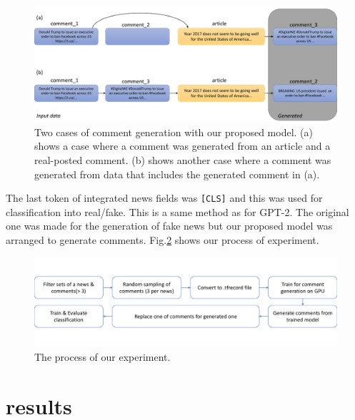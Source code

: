 \documentclass[conference]{IEEEtran}
\begin{document}
\begin{figure}[!t]
    \centering
    \includegraphics[width=\linewidth,pagebox=cropbox,clip]{fig_method.pdf}
    \caption{
        Two cases of comment generation with our proposed model. 
        (a) shows a case where a comment was generated from an article and a real-posted comment. 
        (b) shows another case where a comment was generated from data that includes the generated comment in (a).    }
    \label{fig:method}
\end{figure}

The last token of integrated news fields was \texttt{[CLS]} and this was used for classification into real/fake.
This is a same method as for GPT-2\cite{Radford_GPT2}.
The original one was made for the generation of fake news but our proposed model was arranged to generate comments.
Fig.\ref{fig:process} shows our process of experiment.

\begin{figure}[!t]
    \centering
    \includegraphics[width=0.8\linewidth,pagebox=cropbox,clip]{fig_process.pdf}
    \caption{The process of our experiment.}
    \label{fig:process}
\end{figure}

\section{results}
\end{document}
